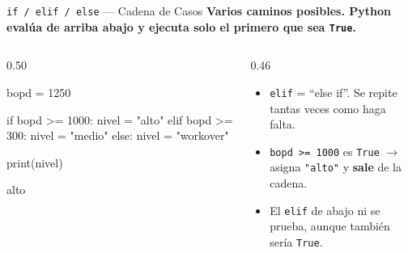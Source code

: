 \documentclass[aspectratio=169, 11pt]{beamer}
\begin{document}
\begin{frame}[fragile,shrink=18]{\texttt{if / elif / else} --- Cadena de Casos}
  \vspace{-4pt}
  {\small\color{arcaDark}\bfseries
    Varios caminos posibles. Python evalúa \textbf{de arriba abajo} y ejecuta \textbf{solo el primero} que sea \texttt{True}.}

  \vspace{6pt}
  \begin{columns}[T]
    \begin{column}{0.50\textwidth}
      \begin{pyblock}
bopd = 1250

if bopd >= 1000:
    nivel = "alto"
elif bopd >= 300:
    nivel = "medio"
else:
    nivel = "workover"

print(nivel)
      \end{pyblock}
      \vspace{2pt}
      \begin{outputblock}
alto
      \end{outputblock}
    \end{column}

    \begin{column}{0.46\textwidth}
      {\scriptsize\color{textMuted}
      \begin{itemize}\setlength{\itemsep}{4pt}
        \item[{\color{arcaRed}\scriptsize\faArrowRight}]
          \texttt{elif} = ``else if''. Se repite
          tantas veces como haga falta.
        \item[{\color{arcaRed}\scriptsize\faArrowRight}]
          \texttt{bopd >= 1000} es \texttt{True} $\to$
          asigna \texttt{"alto"} y \textbf{sale} de
          la cadena.
        \item[{\color{arcaRed}\scriptsize\faArrowRight}]
          El \texttt{elif} de abajo ni se prueba,
          aunque también sería \texttt{True}.
      \end{itemize}
      }
    \end{column}
  \end{columns}
\end{frame}
\end{document}
